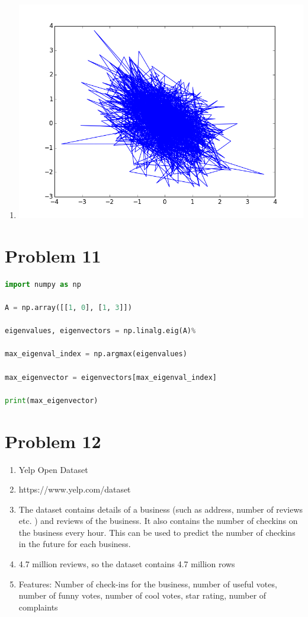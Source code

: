 \documentclass[11pt]{article}
\newcommand{\solution}[1]{{{\color{blue}{\bf Solution:} {#1}}}}
\begin{document}
\begin{enumerate}
\item
\solution{} \newline
\includegraphics[scale=0.5]{10e.png}
\end{enumerate}

\newpage
\section{Problem 11}
\solution{}
\begin{lstlisting}[language=Python]
import numpy as np 

A = np.array([[1, 0], [1, 3]])

eigenvalues, eigenvectors = np.linalg.eig(A)%

max_eigenval_index = np.argmax(eigenvalues)

max_eigenvector = eigenvectors[max_eigenval_index]

print(max_eigenvector)
\end{lstlisting}

\newpage
\section{Problem 12}
\begin{enumerate}
\item Yelp Open Dataset
\item https://www.yelp.com/dataset
\item The dataset contains details of a business (such as address, number of reviews etc. ) and reviews of the business. It also contains the number of checkins on the business every hour. This can be used to predict the number of checkins in the future for each business. 
\item 4.7 million reviews, so the dataset contains 4.7 million rows
\item Features: Number of check-ins for the business, number of useful votes, number of funny votes, number of cool votes, star rating, number of complaints
\end{enumerate}
\end{document}
